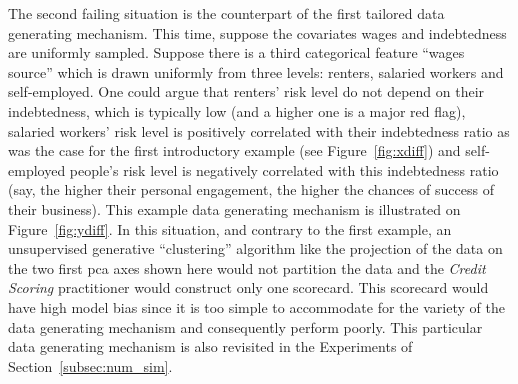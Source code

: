 The second failing situation is the counterpart of the first tailored data generating mechanism. This time, suppose the covariates wages and indebtedness are uniformly sampled. Suppose there is a third categorical feature ``wages source'' which is drawn uniformly from three levels: renters, salaried workers and self-employed. One could argue that renters' risk level do not depend on their indebtedness, which is typically low (and a higher one is a major red flag), salaried workers' risk level is positively correlated with their indebtedness ratio as was the case for the first introductory example (see Figure~\ref{fig:xdiff}) and self-employed people's risk level is negatively correlated with this indebtedness ratio (say, the higher their personal engagement, the higher the chances of success of their business). This example data generating mechanism is illustrated on Figure~\ref{fig:ydiff}. In this situation, and contrary to the first example, an unsupervised generative ``clustering'' algorithm like the projection of the data on the two first \gls{pca} axes shown here would not partition the data and the \textit{Credit Scoring} practitioner would construct only one scorecard. This scorecard would have high model bias since it is too simple to accommodate for the variety of the data generating mechanism and consequently perform poorly. This particular data generating mechanism is also revisited in the Experiments of Section~\ref{subsec:num_sim}.



